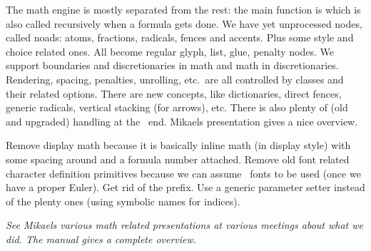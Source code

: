 \startitemize
    \startitem
        The math engine is mostly separated from the rest: the main function is
         which is also called recursively when a formula gets
        done.
    \stopitem
    \startitem
        We have yet unprocessed nodes, called noads: atoms, fractions, radicals,
        fences and accents. Plus some style and choice related ones.
    \stopitem
    \startitem
        All become regular glyph, list, glue, penalty nodes.
    \stopitem
    \startitem
        We support boundaries and discretionaries in math and math in
        discretionaries.
    \stopitem
    \startitem
        Rendering, spacing, penalties, unrolling, etc.\ are all controlled
        by classes and their related options.
    \stopitem
    \startitem
        There are new concepts, like dictionaries, direct fences, generic
        radicals, vertical stacking (for arrows), etc.
    \stopitem
    \startitem
        There is also plenty of (old and upgraded) handling at the \CONTEXT\
        end.
    \stopitem
    \startitem
        Mikaels presentation gives a nice overview.
    \stopitem
\stopitemize

\stoptitle

\starttitle[title=Maybe]

\startitemize
    \startitem
        Remove display math because it is basically inline math (in display
        style) with some spacing around and a formula number attached.
    \stopitem
    \startitem
        Remove old font related character definition primitives because we can
        assume \OPENTYPE\ fonts to be used (once we have a proper Euler).
    \stopitem
    \startitem
        Get rid of the  prefix.
    \stopitem
    \startitem
        Use a generic parameter setter instead of the plenty ones (using symbolic
        names for indices).
    \stopitem
\stopitemize

{\em See Mikaels various math related presentations at various meetings about
what we did. The \quote {Math in \CONTEXT} manual gives a complete overview.}

\stoptitle


\stopdocument
